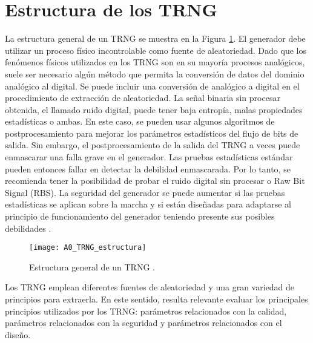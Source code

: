 	\section{Estructura de los TRNG}	

        La estructura general de un TRNG se muestra en la Figura \ref{fig:A1_TRNG_estructura}. El generador debe utilizar un proceso físico incontrolable como fuente de aleatoriedad. Dado que los fenómenos físicos utilizados en los TRNG son en su mayoría procesos analógicos, suele ser necesario algún método que permita la conversión de datos del dominio analógico al digital. Se puede incluir una conversión de analógico a digital en el procedimiento de extracción de aleatoriedad. La señal binaria sin procesar obtenida, el llamado ruido digital, puede tener baja entropía, malas propiedades estadísticas o ambas. En este caso, se pueden usar algunos algoritmos de postprocesamiento para mejorar los parámetros estadísticos del flujo de bits de salida. Sin embargo, el postprocesamiento de la salida del TRNG a veces puede enmascarar una falla grave en el generador. Las pruebas estadísticas estándar pueden entonces fallar en detectar la debilidad enmascarada. Por lo tanto, se recomienda tener la posibilidad de probar el ruido digital sin procesar o Raw Bit Signal (RBS). La seguridad del generador se puede aumentar si las pruebas estadísticas se aplican sobre la marcha y si están diseñadas para adaptarse al principio de funcionamiento del generador teniendo presente sus posibles debilidades \cite{Badrignans2011}.
			
        \begin{figure}[hbtp]
            \centering
            \texttt{[image: A0\_TRNG\_estructura]}
            \caption{Estructura general de un TRNG \cite{Badrignans2011}.}
            \label{fig:A1_TRNG_estructura}
        \end{figure}
	
        Los TRNG emplean diferentes fuentes de aleatoriedad y una gran variedad de principios para extraerla. En este sentido, resulta relevante evaluar los principales principios utilizados por los TRNG: parámetros relacionados con la calidad, parámetros relacionados con la seguridad y parámetros relacionados con el diseño.

